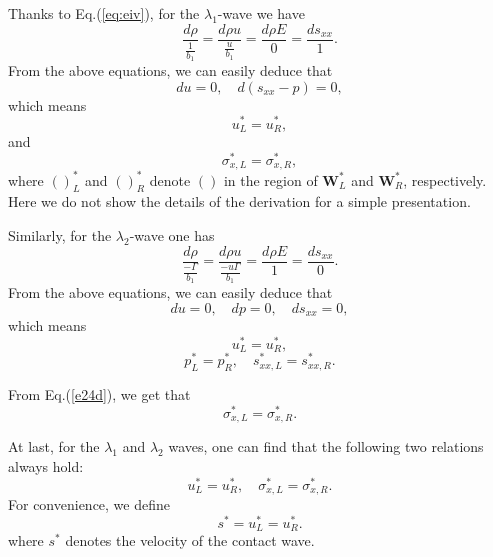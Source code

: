\documentclass[review]{elsarticle}
\begin{document}
Thanks to Eq.(\ref{eq:eiv}), for the $\lambda_{1}$-wave we
have
\begin{equation}   \label{e23a}
\frac{d \rho}{\frac{1}{b_{1}}} = \frac{d \rho u}{\frac{u
}{b_{1}}}=\frac{d \rho E}{0} = \frac{d s_{xx}}{1}.
\end{equation}
From the above equations, we can easily deduce that
\begin{equation}   \label{e23b}
du = 0, \quad d(s_{xx}-p)=0,
\end{equation}
 which means
\begin{equation}   \label{e23c}
  u_{L}^{\ast}=u_{R}^{\ast},
\end{equation}
and
\begin{equation}   \label{e23d}
\sigma_{x,L}^{\ast}=\sigma_{x,R}^{\ast},
\end{equation}
where $()_{L}^{\ast}$ and $()_{R}^{\ast}$ denote $()$ in the region
of $\mathbf{W}_{L}^{\ast}$ and $\mathbf{W}_{R}^{\ast}$,
respectively. Here we do not show the details of the derivation for a simple
 presentation.


Similarly, for the $\lambda_{2}$-wave one
has
\begin{equation}   \label{e24a}
\frac{d \rho}{\frac{-\Gamma}{b_{1}}} = \frac{d \rho u}{\frac{-u
\Gamma}{b_{1}}}=\frac{d \rho E}{1} = \frac{d s_{xx}}{0}.
\end{equation}
From the above equations, we can easily deduce  that
\begin{equation}   \label{e24b}
du = 0, \quad dp=0, \quad ds_{xx}=0,
\end{equation}
 which means
\begin{equation}   \label{e24c}
  u_{L}^{\ast}=u_{R}^{\ast},
\end{equation}
\begin{equation}   \label{e24d}
p_{L}^{\ast}=p_{R}^{\ast}, \quad
  s_{xx,L}^{\ast}=s_{xx,R}^{\ast}.
\end{equation}


From  Eq.(\ref{e24d}), we  get that
\begin{equation}   \label{e27a}
\sigma_{x,L} ^{\ast}=  \sigma_{x,R} ^{\ast}.
\end{equation}


At last, for the $\lambda_{1}$ and $\lambda_{2}$ waves, one can find
that the following two relations always hold:
\begin{equation}   \label{e28}
u_{L}^{\ast}=u_{R}^{\ast}, \quad
\sigma_{x,L}^{\ast}=\sigma_{x,R}^{\ast}.
\end{equation}
For convenience, we define
\begin{equation}\label{eq:contact}
  s^* = u_L^* = u_R^*. %
\end{equation}
where $s^*$ denotes the velocity of the contact wave.
\end{document}
